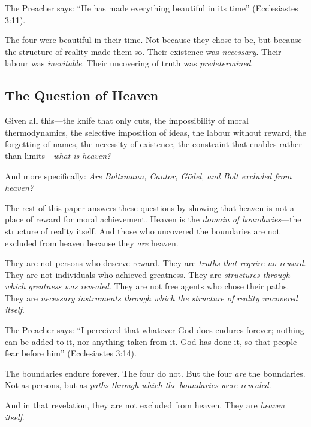 \documentclass[11pt,a4paper]{article}
\begin{document}
The Preacher says: ``He has made everything beautiful in its time'' 
(Ecclesiastes 3:11).

The four were beautiful in their time. Not because they chose to be, but 
because the structure of reality made them so. Their existence was 
\emph{necessary}. Their labour was \emph{inevitable}. Their uncovering of 
truth was \emph{predetermined}.

\subsection{The Question of Heaven}

Given all this—the knife that only cuts, the impossibility of moral 
thermodynamics, the selective imposition of ideas, the labour without reward, 
the forgetting of names, the necessity of existence, the constraint that 
enables rather than limits—\emph{what is heaven?}

And more specifically: \emph{Are Boltzmann, Cantor, Gödel, and Bolt excluded 
from heaven?}

The rest of this paper answers these questions by showing that heaven is not a 
place of reward for moral achievement. Heaven is the \emph{domain of 
boundaries}—the structure of reality itself. And those who uncovered the 
boundaries are not excluded from heaven because they \emph{are} heaven.

They are not persons who deserve reward. They are \emph{truths that require no 
reward}. They are not individuals who achieved greatness. They are 
\emph{structures through which greatness was revealed}. They are not free 
agents who chose their paths. They are \emph{necessary instruments through 
which the structure of reality uncovered itself}.

The Preacher says: ``I perceived that whatever God does endures forever; 
nothing can be added to it, nor anything taken from it. God has done it, so 
that people fear before him'' (Ecclesiastes 3:14).

The boundaries endure forever. The four do not. But the four \emph{are} the 
boundaries. Not as persons, but as \emph{paths through which the boundaries 
were revealed}.

And in that revelation, they are not excluded from heaven. They are 
\emph{heaven itself}.
\end{document}
